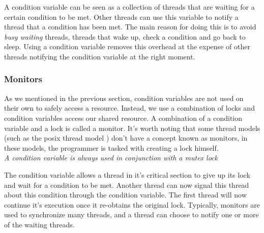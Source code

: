 A condition variable can be seen as a collection of threads that are waiting for a certain condition to be met. Other threads can use this variable to notify a thread that a condition has been met. The main reason for doing this is to avoid \textit{busy waiting} threads, threads that wake up, check a condition and go back to sleep. Using a condition variable removes this overhead at the expense of other threads notifying the condition variable at the right moment.

\subsubsection{Monitors}
As we mentioned in the previous section, condition variables are not used on their own to safely access a resource. Instead, we use a combination of locks and condition variables access our shared resource. A combination of a condition variable and a lock is called a monitor. It's worth noting that some thread models (such as the posix thread model \cite{pthreads}) don't have a concept known as monitors, in these models, the programmer is tasked with creating a lock himself. \\ \textit{A condition variable is always used in conjunction with a mutex lock} \cite[8.1. Condition Variables Overview]{pthreads}

The condition variable allows a thread in it's critical section to give up its lock and wait for a condition to be met. Another thread can now signal this thread about this condition through the condition variable. The first thread will now continue it's execution once it re-obtains the original lock. Typically, monitors are used to synchronize many threads, and a thread can choose to notify one or more of the waiting threads.
